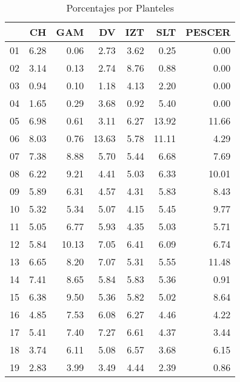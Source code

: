\documentclass[12pt]{article}
\begin{document}
\begin{table}[ht]
\centering
\caption{Porcentajes por Planteles} 
\begin{tabular}{r|rrrrrr}
  \hline
 & CH & GAM & DV & IZT & SLT & PESCER \\ 
  \hline
01 & 6.28 & 0.06 & 2.73 & 3.62 & 0.25 & 0.00 \\ 
  02 & 3.14 & 0.13 & 2.74 & 8.76 & 0.88 & 0.00 \\ 
  03 & 0.94 & 0.10 & 1.18 & 4.13 & 2.20 & 0.00 \\ 
  04 & 1.65 & 0.29 & 3.68 & 0.92 & 5.40 & 0.00 \\ 
  05 & 6.98 & 0.61 & 3.11 & 6.27 & 13.92 & 11.66 \\ 
  06 & 8.03 & 0.76 & 13.63 & 5.78 & 11.11 & 4.29 \\ 
  07 & 7.38 & 8.88 & 5.70 & 5.44 & 6.68 & 7.69 \\ 
  08 & 6.22 & 9.21 & 4.41 & 5.03 & 6.33 & 10.01 \\ 
  09 & 5.89 & 6.31 & 4.57 & 4.31 & 5.83 & 8.43 \\ 
  10 & 5.32 & 5.34 & 5.07 & 4.15 & 5.45 & 9.77 \\ 
  11 & 5.05 & 6.77 & 5.93 & 4.35 & 5.03 & 5.71 \\ 
  12 & 5.84 & 10.13 & 7.05 & 6.41 & 6.09 & 6.74 \\ 
  13 & 6.65 & 8.20 & 7.07 & 5.31 & 5.55 & 11.48 \\ 
  14 & 7.41 & 8.65 & 5.84 & 5.83 & 5.36 & 0.91 \\ 
  15 & 6.38 & 9.50 & 5.36 & 5.82 & 5.02 & 8.64 \\ 
  16 & 4.85 & 7.53 & 6.08 & 6.27 & 4.46 & 4.22 \\ 
  17 & 5.41 & 7.40 & 7.27 & 6.61 & 4.37 & 3.44 \\ 
  18 & 3.74 & 6.11 & 5.08 & 6.57 & 3.68 & 6.15 \\ 
  19 & 2.83 & 3.99 & 3.49 & 4.44 & 2.39 & 0.86 \\ 
   \hline
\end{tabular}
\end{table}
\end{document}
